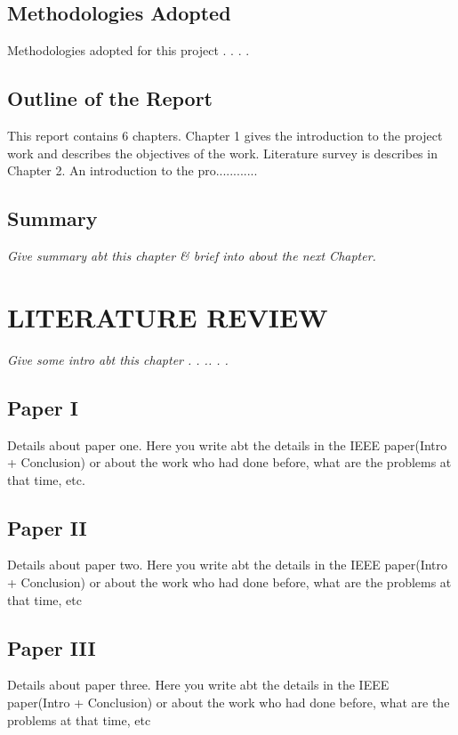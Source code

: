 \documentclass[12 pt, oneside]{book}
\begin{document}
\section{Methodologies Adopted}

Methodologies adopted for this project . . . .


\section{Outline of the Report}

This report contains 6 chapters. Chapter 1 gives the introduction to the project work and describes the objectives of the work. Literature survey is describes in Chapter 2. An introduction to the pro............

\section{Summary}

{\em Give summary abt this chapter \& brief into about the next Chapter.}

\chapter{LITERATURE REVIEW}


{\em Give some intro abt this chapter . . .. .  . }


\section{Paper I \cite{a}}
Details about paper one. Here you write abt the details in the IEEE paper(Intro + Conclusion) or about the work who had done before, what are the problems at that time, etc.

\section{Paper II\cite{b}}
Details about paper two. Here you write abt the details in the IEEE paper(Intro + Conclusion) or about the work who had done before, what are the problems at that time, etc


\section{Paper III\cite{c}}
Details about paper three. Here you write abt the details in the IEEE paper(Intro + Conclusion) or about the work who had done before, what are the problems at that time, etc
\end{document}
